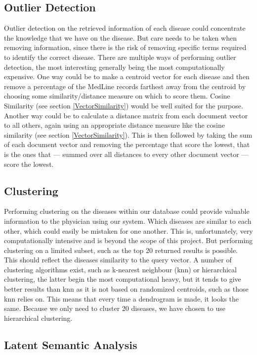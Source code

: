 \subsection{Outlier Detection}

Outlier detection on the retrieved information of each disease could
concentrate the knowledge that we have on the disease. But care needs
to be taken when removing information, since there is the risk of
removing specific terms required to identify the correct
disease. There are multiple ways of performing outlier detection, the
most interesting generally being the most computationally
expensive. One way could be to make a centroid vector for each disease
and then remove a percentage of the MedLine records farthest away from
the centroid by choosing some similarity/distance measure on which to
score them. Cosine Similarity (see section \ref{VectorSimilarity})
would be well suited for the purpose. Another way could be to
calculate a distance matrix from each document vector to all others,
again using an appropriate distance measure like the cosine similarity
(see section \ref{VectorSimilarity}). This is then followed by taking
the sum of each document vector and removing the percentage that score
the lowest, that is the ones that --- summed over all distances to
every other document vector --- score the lowest. 

\subsection{Clustering}

Performing clustering on the diseases within our database could
provide valuable information to the physician using our system. Which
diseases are similar to each other, which could easily be mistaken for
one another. This is, unfortunately, very computationally intensive and
is beyond the scope of this project. But performing clustering on a
limited subset, such as the top 20 returned results is possible. This
should reflect the diseases similarity to the query vector. A number
of clustering algorithms exist, such as k-nearest neighbour (knn) or
hierarchical clustering, the latter begin the most computational
heavy, but it tends to give better results than knn as it is not based on
randomized centroids, such as those knn relies on. This means that
every time a dendrogram is made, it looks the same. Because we only
need to cluster 20 diseases, we have chosen to use hierarchical
clustering.

\subsection{Latent Semantic Analysis\label{LSA}}

